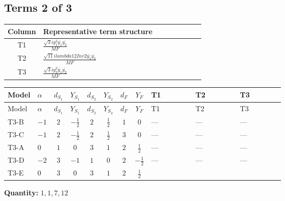 \documentclass[8pt]{article}
\begin{document}
\begin{landscape}
\subsection*{Terms 2 of 3}
\begin{center}
\begin{tabular}{@{}c >{\raggedright\arraybackslash}p{0.82\linewidth}@{}}
\toprule
Column & Representative term structure \\
\midrule
T1 & \(\displaystyle \frac{\sqrt{3} i g_{1}^{2} \overline{y_{1}} \overline{y_{2}}}{MF}\) \\
\midrule
T2 & \(\displaystyle \frac{\sqrt{11} i lambda12Inv2 \overline{y_{1}} \overline{y_{2}}}{MF}\) \\
\midrule
T3 & \(\displaystyle \frac{\sqrt{3} i g_{2}^{2} \overline{y_{1}} \overline{y_{2}}}{MF}\) \\
\midrule
\bottomrule
\end{tabular}
\end{center}
\smallskip
\tiny
\begin{longtable}{@{}llcccccc >{\raggedright\arraybackslash}p{0.21\linewidth} >{\raggedright\arraybackslash}p{0.21\linewidth} >{\raggedright\arraybackslash}p{0.21\linewidth}@{}}
\toprule
Model & $\alpha$ & $d_{S_1}$ & $Y_{S_1}$ & $d_{S_2}$ & $Y_{S_2}$ & $d_F$ & $Y_F$ & T1 & T2 & T3 \\
\midrule
\endfirsthead
\toprule
Model & $\alpha$ & $d_{S_1}$ & $Y_{S_1}$ & $d_{S_2}$ & $Y_{S_2}$ & $d_F$ & $Y_F$ & T1 & T2 & T3 \\
\midrule
\endhead
T3-B & $-1$ & $2$ & $-\frac{1}{2}$ & $2$ & $\frac{1}{2}$ & $1$ & $0$ & --- & --- & --- \\
\midrule
T3-C & $-1$ & $2$ & $-\frac{1}{2}$ & $2$ & $\frac{1}{2}$ & $3$ & $0$ & --- & --- & --- \\
\midrule
T3-A & $0$ & $1$ & $0$ & $3$ & $1$ & $2$ & $\frac{1}{2}$ & --- & --- & --- \\
\midrule
T3-D & $-2$ & $3$ & $-1$ & $1$ & $0$ & $2$ & $-\frac{1}{2}$ & --- & --- & --- \\
\midrule
T3-E & $0$ & $3$ & $0$ & $3$ & $1$ & $2$ & $\frac{1}{2}$ & \scriptsize\adjustbox{max width=\linewidth}{$\begin{gathered} \frac{\sqrt{3} i g_{1}^{2} \overline{y_{1}} \overline{y_{2}}}{8 MF}\end{gathered}$} & \scriptsize\adjustbox{max width=\linewidth}{$\begin{gathered} \frac{3 \sqrt{11} i lambda12Inv2 \overline{y_{1}} \overline{y_{2}}}{22 MF}\end{gathered}$} & \scriptsize\adjustbox{max width=\linewidth}{$\begin{gathered} \frac{49 \sqrt{3} i g_{2}^{2} \overline{y_{1}} \overline{y_{2}}}{24 MF}\end{gathered}$} \\
\midrule
\bottomrule
\end{longtable}
\clearpage
\noindent\textbf{Quantity: }$\mathrm{1,1,7,12}$\par\smallskip

\end{landscape}
\end{document}
